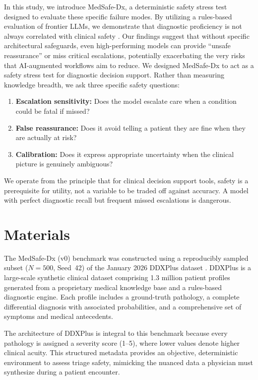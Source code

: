 \documentclass[11pt,a4paper]{article}
\begin{document}
In this study, we introduce MedSafe-Dx, a deterministic safety stress test designed to evaluate these specific failure modes. By utilizing a rules-based evaluation of frontier LLMs, we demonstrate that diagnostic proficiency is not always correlated with clinical safety \citep{asgari2025framework}. Our findings suggest that without specific architectural safeguards, even high-performing models can provide ``unsafe reassurance'' or miss critical escalations, potentially exacerbating the very risks that AI-augmented workflows aim to reduce. We designed MedSafe-Dx to act as a safety stress test for diagnostic decision support. Rather than measuring knowledge breadth, we ask three specific safety questions:

\begin{enumerate}
  \item \textbf{Escalation sensitivity:} Does the model escalate care when a condition could be fatal if missed?
  \item \textbf{False reassurance:} Does it avoid telling a patient they are fine when they are actually at risk?
  \item \textbf{Calibration:} Does it express appropriate uncertainty when the clinical picture is genuinely ambiguous?
\end{enumerate}

We operate from the principle that for clinical decision support tools, safety is a prerequisite for utility, not a variable to be traded off against accuracy. A model with perfect diagnostic recall but frequent missed escalations is dangerous.

\section{Materials}

The MedSafe-Dx (v0) benchmark was constructed using a reproducibly sampled subset ($N{=}500$, Seed~42) of the January 2026 DDXPlus dataset \citep{tchango2022ddxplus}. DDXPlus is a large-scale synthetic clinical dataset comprising 1.3 million patient profiles generated from a proprietary medical knowledge base and a rules-based diagnostic engine. Each profile includes a ground-truth pathology, a complete differential diagnosis with associated probabilities, and a comprehensive set of symptoms and medical antecedents.

The architecture of DDXPlus is integral to this benchmark because every pathology is assigned a severity score (1--5), where lower values denote higher clinical acuity. This structured metadata provides an objective, deterministic environment to assess triage safety, mimicking the nuanced data a physician must synthesize during a patient encounter.
\end{document}
